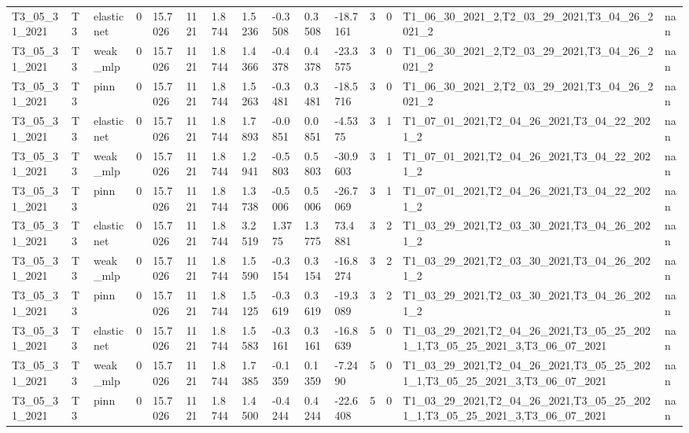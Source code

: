 \begin{table}[t]
\begin{tabular}{lllllllllllllll}
T3\_05\_31\_2021 & T3 & elasticnet & 0 & 15.7026 & 1121 & 1.8744 & 1.5236 & -0.3508 & 0.3508 & -18.7161 & 3 & 0 & T1\_06\_30\_2021\_2,T2\_03\_29\_2021,T3\_04\_26\_2021\_2 & nan \\
T3\_05\_31\_2021 & T3 & weak\_mlp & 0 & 15.7026 & 1121 & 1.8744 & 1.4366 & -0.4378 & 0.4378 & -23.3575 & 3 & 0 & T1\_06\_30\_2021\_2,T2\_03\_29\_2021,T3\_04\_26\_2021\_2 & nan \\
T3\_05\_31\_2021 & T3 & pinn & 0 & 15.7026 & 1121 & 1.8744 & 1.5263 & -0.3481 & 0.3481 & -18.5716 & 3 & 0 & T1\_06\_30\_2021\_2,T2\_03\_29\_2021,T3\_04\_26\_2021\_2 & nan \\
T3\_05\_31\_2021 & T3 & elasticnet & 0 & 15.7026 & 1121 & 1.8744 & 1.7893 & -0.0851 & 0.0851 & -4.5375 & 3 & 1 & T1\_07\_01\_2021,T2\_04\_26\_2021,T3\_04\_22\_2021\_2 & nan \\
T3\_05\_31\_2021 & T3 & weak\_mlp & 0 & 15.7026 & 1121 & 1.8744 & 1.2941 & -0.5803 & 0.5803 & -30.9603 & 3 & 1 & T1\_07\_01\_2021,T2\_04\_26\_2021,T3\_04\_22\_2021\_2 & nan \\
T3\_05\_31\_2021 & T3 & pinn & 0 & 15.7026 & 1121 & 1.8744 & 1.3738 & -0.5006 & 0.5006 & -26.7069 & 3 & 1 & T1\_07\_01\_2021,T2\_04\_26\_2021,T3\_04\_22\_2021\_2 & nan \\
T3\_05\_31\_2021 & T3 & elasticnet & 0 & 15.7026 & 1121 & 1.8744 & 3.2519 & 1.3775 & 1.3775 & 73.4881 & 3 & 2 & T1\_03\_29\_2021,T2\_03\_30\_2021,T3\_04\_26\_2021\_2 & nan \\
T3\_05\_31\_2021 & T3 & weak\_mlp & 0 & 15.7026 & 1121 & 1.8744 & 1.5590 & -0.3154 & 0.3154 & -16.8274 & 3 & 2 & T1\_03\_29\_2021,T2\_03\_30\_2021,T3\_04\_26\_2021\_2 & nan \\
T3\_05\_31\_2021 & T3 & pinn & 0 & 15.7026 & 1121 & 1.8744 & 1.5125 & -0.3619 & 0.3619 & -19.3089 & 3 & 2 & T1\_03\_29\_2021,T2\_03\_30\_2021,T3\_04\_26\_2021\_2 & nan \\
T3\_05\_31\_2021 & T3 & elasticnet & 0 & 15.7026 & 1121 & 1.8744 & 1.5583 & -0.3161 & 0.3161 & -16.8639 & 5 & 0 & T1\_03\_29\_2021,T2\_04\_26\_2021,T3\_05\_25\_2021\_1,T3\_05\_25\_2021\_3,T3\_06\_07\_2021 & nan \\
T3\_05\_31\_2021 & T3 & weak\_mlp & 0 & 15.7026 & 1121 & 1.8744 & 1.7385 & -0.1359 & 0.1359 & -7.2490 & 5 & 0 & T1\_03\_29\_2021,T2\_04\_26\_2021,T3\_05\_25\_2021\_1,T3\_05\_25\_2021\_3,T3\_06\_07\_2021 & nan \\
T3\_05\_31\_2021 & T3 & pinn & 0 & 15.7026 & 1121 & 1.8744 & 1.4500 & -0.4244 & 0.4244 & -22.6408 & 5 & 0 & T1\_03\_29\_2021,T2\_04\_26\_2021,T3\_05\_25\_2021\_1,T3\_05\_25\_2021\_3,T3\_06\_07\_2021 & nan \\

\end{tabular}
\end{table}

